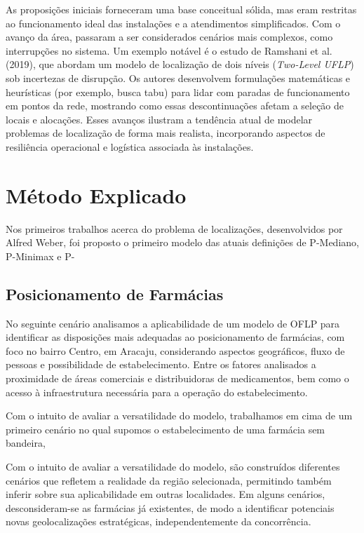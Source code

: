 \documentclass[12pt]{article}
\begin{document}
As proposições iniciais forneceram uma base conceitual sólida, mas eram restritas ao funcionamento ideal das instalações e a atendimentos simplificados. Com o avanço da área, passaram a ser considerados cenários mais complexos, como interrupções no sistema. Um exemplo notável é o estudo de Ramshani et al. (2019), que abordam um modelo de localização de dois níveis (\textit{Two-Level UFLP}) sob incertezas de disrupção. Os autores desenvolvem formulações matemáticas e heurísticas (por exemplo, busca tabu) para lidar com paradas de funcionamento em pontos da rede, mostrando como essas descontinuações afetam a seleção de locais e alocações. Esses avanços ilustram a tendência atual de modelar problemas de localização de forma mais realista, incorporando aspectos de resiliência operacional e logística associada às instalações.

\section{Método Explicado}

Nos primeiros trabalhos acerca do problema de localizações, desenvolvidos por Alfred Weber, foi proposto o primeiro modelo das atuais definições de P-Mediano, P-Minimax e P-

\subsection{Posicionamento de Farmácias}

No seguinte cenário analisamos a aplicabilidade de um modelo de OFLP para identificar as disposições mais adequadas ao posicionamento de farmácias, com foco no bairro Centro, em Aracaju, considerando aspectos geográficos, fluxo de pessoas e possibilidade de estabelecimento. Entre os fatores analisados a proximidade de áreas comerciais e distribuidoras de medicamentos, bem como o acesso à infraestrutura necessária para a operação do estabelecimento.

Com o intuito de avaliar a versatilidade do modelo, trabalhamos em cima de um primeiro cenário no qual supomos o estabelecimento de uma farmácia sem bandeira, 

Com o intuito de avaliar a versatilidade do modelo, são construídos diferentes cenários que refletem a realidade da região selecionada, permitindo também inferir sobre sua aplicabilidade em outras localidades. Em alguns cenários, desconsideram-se as farmácias já existentes, de modo a identificar potenciais novas geolocalizações estratégicas, independentemente da concorrência.
\end{document}
